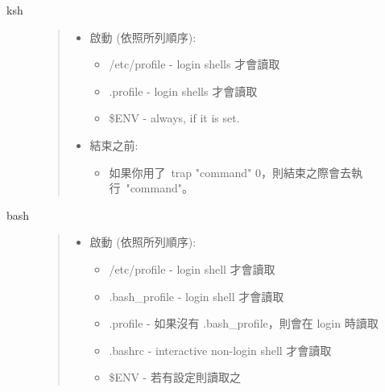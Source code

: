 \documentclass{article}
\begin{document}
\begin{CJK*}{Bg5}{ming}
\begin{description}
      \item[ksh]
\begin{quote}
	\begin{itemize}
	\item 啟動 (依照所列順序):
	  \begin{itemize}
              \item /etc/profile - login shells 才會讀取
              \item .profile     - login shells 才會讀取
              \item \$ENV        - always, if it is set.
	  \end{itemize}

          \item 結束之前:
	  \begin{itemize}
            \item 如果你用了~trap "command" 0，則結束之際會去執行~"command"。
	  \end{itemize}
	\end{itemize}
\end{quote}

      \item[bash]
\begin{quote}
	\begin{itemize}
         \item 啟動 (依照所列順序):
	 \begin{itemize}
           \item   /etc/profile  - login shell 才會讀取
           \item   .bash\_profile - login shell 才會讀取
           \item   .profile      - 如果沒有 .bash\_profile，則會在 login 時讀取
           \item   .bashrc       - interactive non-login shell 才會讀取
           \item   \$ENV          - 若有設定則讀取之
	 \end{itemize}


\end{itemize}
\end{quote}
\end{description}
\end{CJK*}
\end{document}
